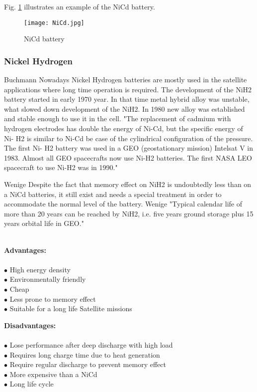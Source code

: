 Fig. \ref{fig: nicd} illustrates an example of the NiCd battery. 



\begin{figure}[h]
	\centering
	\texttt{[image: NiCd.jpg]}
	\caption{NiCd battery\cite{9}}
	\label{fig: nicd}
\end{figure} 


\subsubsection{Nickel Hydrogen \label{sec:tech}}
Buchmann\cite{7} Nowadays Nickel Hydrogen batteries are mostly used in the satellite applications where long time operation is required. The development of the NiH2 battery started in early 1970 year. In that time metal hybrid alloy was unstable, what slowed down development of the NiH2. In 1980 new alloy was established and stable enough to use it in the cell. 
\cite{10}"The replacement of cadmium with hydrogen electrodes has double the energy of Ni-Cd, but the specific energy of Ni- H2 is similar to Ni-Cd be case of the cylindrical configuration of the pressure. The first Ni- H2 battery was used in a GEO (geostationary mission) Intelsat V in 1983.  Almost all GEO spacecrafts now use Ni-H2 batteries. The first NASA LEO spacecraft to use Ni-H2 was in 1990."


Wenige\cite{8} Despite the fact that memory effect on NiH2 is undoubtedly less than on a NiCd batteries, it still exist and needs a special treatment in order to accommodate the normal level of the battery. Wenige\cite{8} "Typical calendar life of more than 20 years can be reached by NiH2, i.e. five years ground storage plus 15  years  orbital  life  in  GEO." \\ \\


\begin{multicols}{2}
	
	\textbf{Advantages:} \\ \\
	$\bullet$ High energy density\\
	$\bullet$ Environmentally friendly\\
	$\bullet$ Cheap\\
	$\bullet$ Less prone to memory effect\\
	$\bullet$ Suitable for a long life Satellite missions\\
	

	
	
	\columnbreak
	
	\textbf{Disadvantages:} \\ \\
	$\bullet$ Lose performance after deep discharge with high load\\
	$\bullet$ Requires long charge time due to heat generation\\
	$\bullet$ Require regular discharge to prevent memory effect\\ 
	$\bullet$ More expensive than a NiCd\\
	$\bullet$ Long life cycle

	
\end{multicols}

